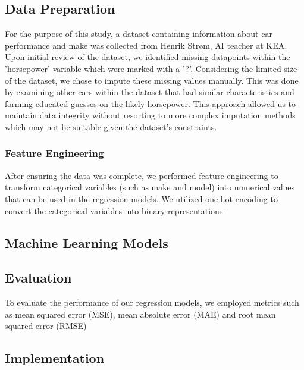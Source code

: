 \documentclass[a4paper, twocolumn]{article}
\begin{document}
\subsection{Data Preparation}

For the purpose of this study, a dataset containing information about car performance and make was collected from Henrik Strøm, AI teacher at KEA. Upon initial review of the dataset, we identified missing datapoints within the 'horsepower' variable which were marked with a '?'. Considering the limited size of the dataset, we chose to impute these missing values manually. This was done by examining other cars within the dataset that had similar characteristics and forming educated guesses on the likely horsepower. This approach allowed us to maintain data integrity without resorting to more complex imputation methods which may not be suitable given the dataset's constraints.

\subsubsection{Feature Engineering}

After ensuring the data was complete, we performed feature engineering to transform categorical variables (such as make and model) into numerical values that can be used in the regression models. We utilized one-hot encoding to convert the categorical variables into binary representations.

\subsection{Machine Learning Models}

\subsection{Evaluation}
To evaluate the performance of our regression models, we employed metrics such as mean squared error (MSE), mean absolute error (MAE) and root mean squared error (RMSE)

\subsection{Implementation}



\end{document}
